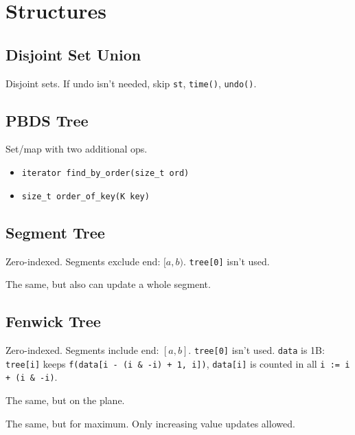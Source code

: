 \section{Structures}

\subsection{Disjoint Set Union}

Disjoint sets.
If undo isn't needed, skip \verb|st|, \verb|time()|, \verb|undo()|.

\subsection{PBDS Tree}

Set/map with two additional ops.

\begin{itemize}
    \item \verb|iterator find_by_order(size_t ord)|
    \item \verb|size_t order_of_key(K key)|
\end{itemize}

\subsection{Segment Tree}

Zero-indexed.
Segments exclude end: $[a, b)$.
\verb|tree[0]| isn't used.

\pagebreak

The same, but also can update a whole segment.

\subsection{Fenwick Tree}

Zero-indexed.
Segments include end: $[a, b]$.
\verb|tree[0]| isn't used.
\verb|data| is 1B: \verb|tree[i]| keeps \verb|f(data[i - (i & -i) + 1, i])|, \verb|data[i]| is counted in all \verb|i := i + (i & -i)|.

The same, but on the plane.

The same, but for maximum. Only increasing value updates allowed.

